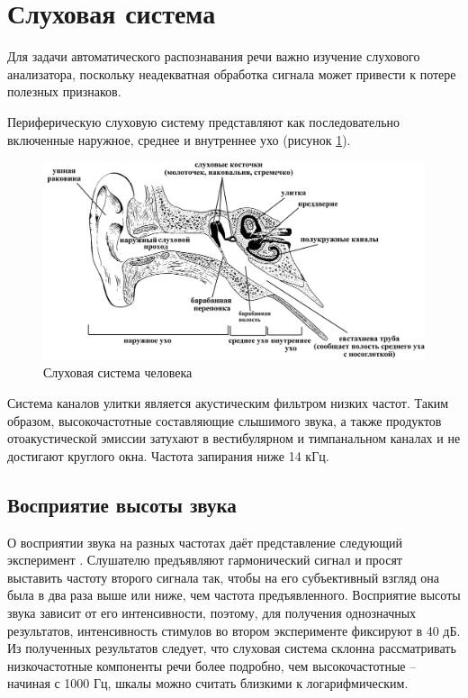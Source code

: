 \section{Слуховая система}

Для задачи автоматического распознавания речи важно изучение слухового анализатора, поскольку неадекватная обработка сигнала может привести к потере полезных признаков. 

Периферическую слуховую систему представляют как последовательно включенные наружное, среднее и внутреннее ухо (рисунок \ref{fig:hearing}).

\begin{figure}[H]
	\centering
	\includegraphics[width=0.9\linewidth]{assets/hear.jpg}
	\caption{Слуховая система человека}
	\label{fig:hearing}
\end{figure}

Система каналов улитки является акустическим фильтром низких частот. Таким образом, высокочастотные составляющие слышимого звука, а также продуктов отоакустической эмиссии затухают в вестибулярном и тимпанальном каналах и не достигают круглого окна. Частота запирания ниже 14 кГц\cite{Дидковский2014}. 

\subsection{Восприятие высоты звука}
О восприятии звука на разных частотах даёт представление следующий эксперимент \cite{Алдошина1999}. Слушателю предъявляют гармонический сигнал и просят выставить частоту второго сигнала так, чтобы на его субъективный взгляд она была в два раза выше или ниже, чем частота предъявленного. Восприятие высоты звука зависит от его интенсивности, поэтому, для получения однозначных результатов, интенсивность стимулов во втором эксперименте фиксируют в 40 дБ. Из полученных результатов следует, что слуховая система склонна рассматривать низкочастотные компоненты речи более подробно, чем высокочастотные -- начиная с 1000 Гц, шкалы можно считать близкими к логарифмическим. 

